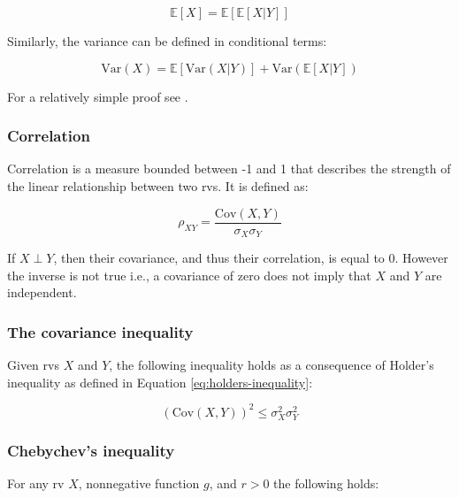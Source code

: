 \documentclass{report}
\begin{document}
\begin{equation}\label{eq:conditional-expectation}
    \mathbb{E}[X] = \mathbb{E}\left[\mathbb{E}[X|Y]\right]
\end{equation}

Similarly, the variance can be defined in conditional terms:

\begin{equation}\label{eq:conditional-variance-2}
    \text{Var}(X) = \mathbb{E}\left[\text{Var}(X|Y)\right] + \text{Var}\left(\mathbb{E}[X|Y]\right)
\end{equation}

For a relatively simple proof see \cite[Chapter~4.4]{casella_statistical_2002}. 

\subsubsection{Correlation}

Correlation is a measure bounded between -1 and 1 that describes the strength of the linear relationship between two \glspl{rv}. It is defined as:

\begin{equation}\label{eq:correlation}
    \rho_{XY} = \frac{\text{Cov}(X, Y)}{\sigma_X\sigma_Y}
\end{equation}

If $X \perp Y$, then their covariance, and thus their correlation, is equal to 0. However the inverse is not true i.e., a covariance of zero does not imply that $X$ and $Y$ are independent.  

\subsubsection{The covariance inequality}

Given \glspl{rv} $X$ and $Y$, the following inequality holds as a consequence of Holder's inequality as defined in Equation \ref{eq:holders-inequality}:

\begin{equation}\label{eq:covariance-inequality}
    \left(\text{Cov}(X,Y)\right)^2 \leq \sigma^2_X\sigma^2_Y
\end{equation}

\subsubsection{Chebychev's inequality}

For any \gls{rv} $X$, nonnegative function $g$, and $r > 0$ the following holds:
\end{document}
